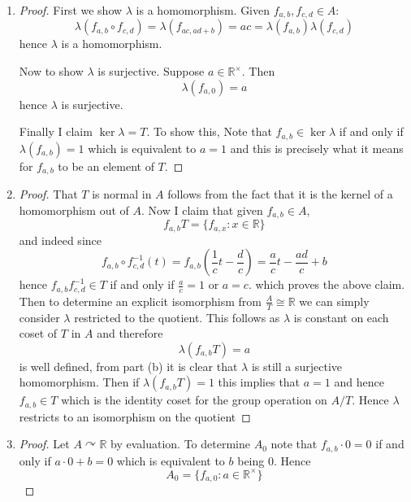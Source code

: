 \documentclass[12pt]{article}
\begin{document}
\begin{enumerate}
    \item[(b)]
    \begin{proof}
        First we show $\lambda$ is a homomorphism. Given $f_{a, b}, f_{c, d} \in A$:
        \[ \lambda(f_{a, b} \circ f_{c, d}) = \lambda(f_{ac, ad + b}) = ac = \lambda(f_{a, b})\lambda(f_{c, d}) \]
        hence $\lambda$ is a homomorphism.

        Now to show $\lambda$ is surjective. Suppose $a \in \mathbb R^\times$. Then
        \[ \lambda(f_{a, 0}) = a \]
        hence $\lambda$ is surjective.

        Finally I claim $\ker \lambda = T$. To show this, Note that $f_{a, b} \in \ker \lambda$
        if and only if $\lambda(f_{a, b}) = 1$ which is equivalent to $a = 1$ and this is precisely what it means for $f_{a, b}$ to be an element of $T$.
    \end{proof}

    \item[(c)]
    \begin{proof}
        That $T$ is normal in $A$ follows from the fact that it is the kernel of a homomorphism out of $A$.
        Now I claim that given $f_{a, b} \in A$,
        \[ f_{a, b}T = \{ f_{a, x} : x \in \mathbb R \} \]
        and indeed since
        \[ f_{a, b} \circ f_{c, d}^{-1}(t) = f_{a, b}(\frac{1}{c}t - \frac{d}{c}) = \frac{a}{c}t - \frac{ad}{c} + b \]
        hence $f_{a, b}f_{c, d}^{-1} \in T$ if and only if $\frac{a}{c} = 1$ or $a = c$.
        which proves the above claim.
        Then to determine an explicit isomorphism from $\frac{A}{T} \cong \mathbb R$
        we can simply consider $\lambda$ restricted to the quotient.
        This follows as $\lambda$ is constant on each coset of $T$ in $A$
        and therefore
        \[ \lambda(f_{a, b}T) = a \]
        is well defined, from part (b) it is clear that $\lambda$ is still a surjective homomorphism.
        Then if $\lambda(f_{a, b}T) = 1$ this implies that $a = 1$ and hence $f_{a, b} \in T$
        which is the identity coset for the group operation on $A/T$. Hence $\lambda$ restricts
        to an isomorphism on the quotient
    \end{proof}

    \item[(d)]
    \begin{proof}
        Let $A \curvearrowright \mathbb R$ by evaluation.
        To determine $A_0$ note that $f_{a, b} \cdot 0 = 0$ if and only if
        $a \cdot 0 + b = 0$ which is equivalent to $b$ being 0. Hence
        \[ A_0 = \{ f_{a, 0} : a \in \mathbb R^\times \} \]


\end{proof}
\end{enumerate}
\end{document}
